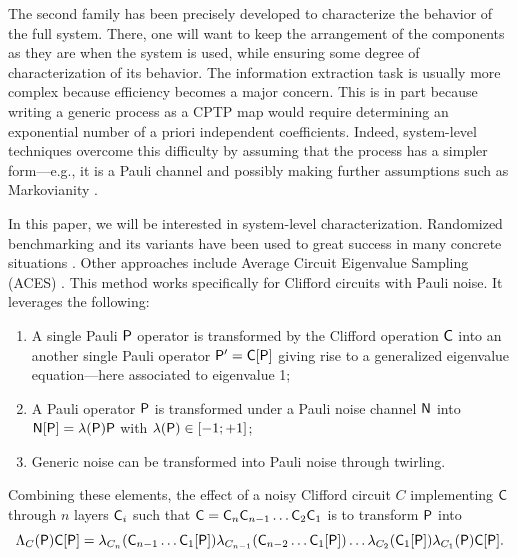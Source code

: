 The second family has been precisely developed to characterize the behavior of the full system. There, one will want to keep the arrangement of the components as they are when the system is used, while ensuring some degree of characterization of its behavior. The information extraction task is usually more complex because efficiency becomes a major concern. This is in part because writing a generic process as a CPTP map would require determining an exponential number of a priori independent coefficients. Indeed, system-level techniques overcome this difficulty by assuming that the process has a simpler form---e.g., it is a Pauli channel \cite{Fawzi2023LowerBoundsPauliChannels, Flammia2020EfficientEstimationPauliChannels, Chen2022LearnabilityPauliNoise, Flammia2021PauliErrorEstimationPopulationRecovery, Harper2020EfficientLearningQuantumNoise, Harper2019EfficientLearningGeneralizedPauliChannels, Harper2023LearningCorrelatedNoise39Qubit, Wagner2023LocalityStructuredPauliNoise} and possibly making further assumptions such as Markovianity \cite{rouze2023efficientlearningstructureparameters}.

In this paper, we will be interested in system-level characterization. Randomized benchmarking and its variants have been used to great success in many concrete situations \cite{Franca2018ApproximationRandomizedBenchmarking, Helsen2019SpectralRB, Helsen2022GeneralFrameworkRB, Magesan2012EfficientMeasurementGateError, Heinrich2023RandomizedBenchmarkingRandomQuantumCircuits}. Other approaches include Average Circuit Eigenvalue Sampling (ACES) \cite{Flammia2021AverageCircuitEigenvalueSampling}. This method works specifically for Clifford circuits with Pauli noise. It leverages the following:
\begin{enumerate}
\item A single Pauli $\mathsf{P}$ operator is transformed by the Clifford operation $\mathsf{C}$ into an another single Pauli operator $\mathsf{P}'=\mathsf{C}[\mathsf{P}]$ giving rise to a generalized eigenvalue equation---here associated to eigenvalue 1;
\item A Pauli operator $\mathsf{P}$ is transformed under a Pauli noise channel $\mathsf{N}$ into $\mathsf{N}[\mathsf{P}] = \lambda(\mathsf{P}) \mathsf{P}$ with $\lambda(\mathsf{P}) \in [-1;+1]$;
\item Generic noise can be transformed into Pauli noise through twirling.
\end{enumerate}
Combining these elements, the effect of a noisy Clifford circuit $C$ implementing \(\mathsf{C}\) through \(n\) layers \({\mathsf{C}}_i\) such that $\mathsf{C} = \mathsf{C}_n \mathsf{C}_{n-1} \ldots \mathsf{C}_2 \mathsf{C}_1$ is to transform $\mathsf{P}$ into
\begin{equation}
  \Lambda_{C}(\mathsf{P}) \mathsf{C}[\mathsf{P}] =
  \lambda_{C_n}(\mathsf{C}_{n-1} \ldots \mathsf{C}_1[\mathsf{P}])
  \lambda_{C_{n-1}}(\mathsf{C}_{n-2} \ldots \mathsf{C}_1[\mathsf{P}])  \ldots
  \lambda_{C_2}(\mathsf{C}_1[\mathsf{P}])
  \lambda_{C_1}(\mathsf{P}) \mathsf{C}[\mathsf{P}].\label{eq:aces}
\end{equation}

